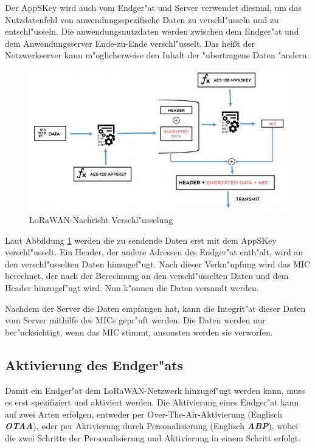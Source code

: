 Der AppSKey wird auch vom Endger"at und Server verwendet diesmal, um 
das Nutzdatenfeld von anwendungsspezifische Daten zu verschl"usseln 
und zu entschl"usseln. Die anwendungsnutzdaten werden zwischen dem 
Endger"at und dem Anwendungsserver Ende-zu-Ende verschl"usselt. Das 
hei\ss{}t der Netzwerkserver kann m"oglicherweise den Inhalt der 
"ubertragene Daten "andern. 

\begin{figure}[h]
	\centering
	\includegraphics[width=14cm]{source/images/WAN}
	\caption{LoRaWAN-Nachricht Verschl"usselung 
		\cite{Entcription}\label{fig:Entcription}}
\end{figure}

Laut Abbildung \ref{fig:Entcription} werden die zu sendende Daten erst 
mit dem AppSKey verschl"usselt. Ein Header, der andere Adressen des 
Endger"at enth"alt, wird an den verschl"usselten Daten hinzugef"ugt. 
Nach dieser Verkn"upfung wird das MIC berechnet, der nach der 
Berechnung an den verschl"usselten Daten und dem Header hinzugef"ugt 
wird. Nun k"onnen die Daten versandt werden. 

Nachdem der Server die Daten empfangen hat, kann die Integrit"at 
dieser Daten vom Server mithilfe des MICs gepr"uft werden. Die Daten 
werden nur ber"ucksichtigt, wenn das MIC stimmt, ansonsten werden sie 
verworfen.  

\vspace{5cm}
\subsection{Aktivierung des Endger"ats}
Damit ein Endger"at dem LoRaWAN-Netzwerk hinzugef"ugt werden kann, 
muss es erst spezifiziert und aktiviert werden. Die Aktivierung eines 
Endger"at kann auf zwei Arten erfolgen, entweder per 
Over-The-Air-Aktivierung (Englisch \textbf{\textit{\ac{OTAA}}}), oder 
per Aktivierung durch Personalisierung (Englisch 
\textbf{\textit{\ac{ABP}}}), wobei die zwei Schritte der 
Personalisierung und Aktivierung in einem Schritt erfolgt. 

